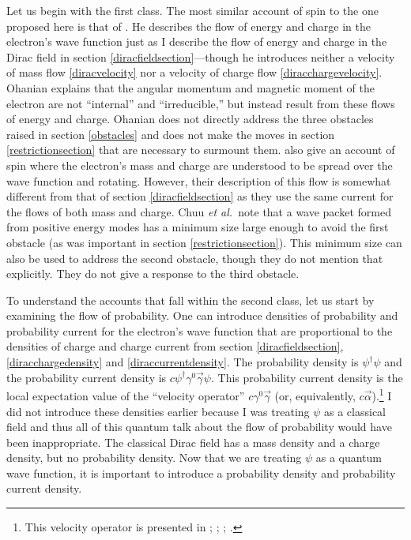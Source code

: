 \documentclass[onecolumn,secnumarabic,amsmath,amssymb,balancelastpage,nofootinbib]{article}
\begin{document}
Let us begin with the first class.  The most similar account of spin to the one proposed here is that of \citet{ohanian}.  He describes the flow of energy and charge in the electron's wave function just as I describe the flow of energy and charge in the Dirac field in section \ref{diracfieldsection}---though he introduces neither a velocity of mass flow \eqref{diracvelocity} nor a velocity of charge flow \eqref{diracchargevelocity}.  Ohanian explains that the angular momentum and magnetic moment of the electron are not ``internal'' and ``irreducible,'' but instead result from these flows of energy and charge.  Ohanian does not directly address the three obstacles raised in section \ref{obstacles} and does not make the moves in section \ref{restrictionsection} that are necessary to surmount them.  \citet{chuu2007} also give an account of spin where the electron's mass and charge are understood to be spread over the wave function and rotating.  However, their description of this flow is somewhat different from that of section \ref{diracfieldsection} as they use the same current for the flows of both mass and charge.  Chuu \textit{et al.\ }note that a wave packet formed from positive energy modes has a minimum size large enough to avoid the first obstacle (as was important in section \ref{restrictionsection}).  This minimum size can also be used to address the second obstacle, though they do not mention that explicitly.  They do not give a response to the third obstacle.

To understand the accounts that fall within the second class, let us start by examining the flow of probability.  One can introduce densities of probability and probability current for the electron's wave function that are proportional to the densities of charge and charge current from section \ref{diracfieldsection}, \eqref{diracchargedensity} and \eqref{diraccurrentdensity}.  The probability density is $\psi^\dagger \psi$ and the probability current density is $c\psi^\dagger\gamma^{0} \vec{\gamma}\psi$.  This probability current density is the local expectation value of the ``velocity operator'' $c\gamma^{0} \vec{\gamma}$ (or, equivalently, $c\vec{\alpha}$).\footnote{This velocity operator is presented in \citet[sections 31 and 32]{frenkel}; \citet[section 69]{dirac}; \citet[pg. 920--922]{messiah1962}; \citet[pg.\ 11]{bjorkendrell}.}  I did not introduce these densities earlier because I was treating $\psi$ as a classical field and thus all of this quantum talk about the flow of probability would have been inappropriate.  The classical Dirac field has a mass density and a charge density, but no probability density.  Now that we are treating $\psi$ as a quantum wave function, it is important to introduce a probability density and probability current density.
\end{document}
